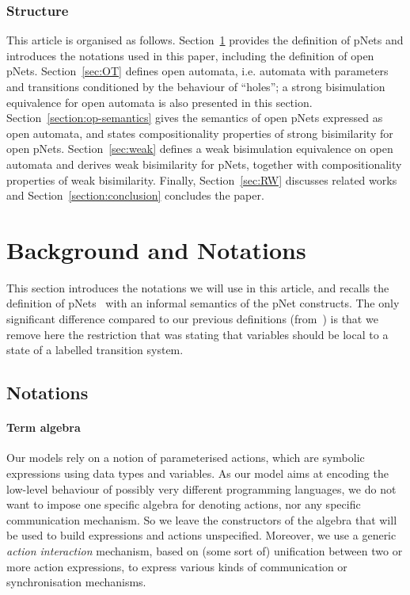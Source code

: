 \documentclass{elsarticle}
\begin{document}
\subsubsection*{Structure}
This article is organised as follows. Section~\ref{sec:notations}
provides the definition of pNets and introduces the notations used in
this paper, including the definition of open pNets. 
Section~\ref{sec:OT} defines open automata, i.e. automata
with parameters and transitions conditioned by the behaviour of
``holes''; a strong bisimulation equivalence for open automata is also
presented in this section. 
Section~\ref{section:op-semantics} gives
the semantics of open pNets expressed as open automata, and states
compositionality properties of strong bisimilarity for open
pNets. 
Section~\ref{sec:weak} defines a weak bisimulation
equivalence on open automata and derives weak bisimilarity for pNets,
together with compositionality properties  of weak bisimilarity. 
Finally, Section~\ref{sec:RW} discusses related works and Section~\ref{section:conclusion} concludes the
paper. 


\section{Background and Notations}\label{sec:notations}
This section introduces the notations we will use in this article, and  recalls the definition of pNets~\cite{henrio:Forte2016} with an informal semantics  of the pNet constructs. The only significant difference compared to our previous definitions (from~\cite{henrio:Forte2016}) is that we remove here the restriction that was stating that variables should be local to a state of a labelled transition system.




\subsection{Notations}
\paragraph{Term algebra}
Our models rely on a notion of parameterised actions, which are
symbolic expressions using data types and variables. As our model aims
at encoding the low-level behaviour of possibly very different
programming languages, we do not want to impose one specific algebra
for denoting actions, nor any specific communication mechanism. So we
leave  the constructors of the algebra that will be used to build
expressions and actions unspecified. Moreover, we use a generic {\em action interaction}
mechanism, based on (some sort of) unification between two or more action
expressions, to express various kinds of communication or
synchronisation mechanisms.
\end{document}
